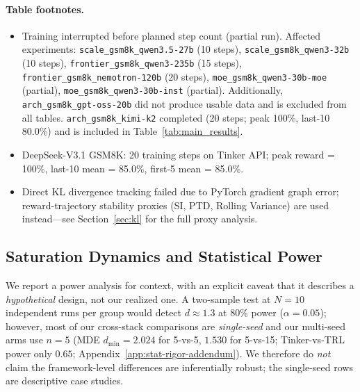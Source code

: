 \documentclass{article}
\begin{document}
\paragraph{Table footnotes.}
\begin{itemize}
    \item[$^\dagger$] Training interrupted before planned step count (partial run).
    Affected experiments:
    \texttt{scale\_gsm8k\_qwen3.5-27b} (10 steps), \texttt{scale\_gsm8k\_qwen3-32b} (10 steps),
    \texttt{frontier\_gsm8k\_qwen3-235b} (15 steps), \texttt{frontier\_gsm8k\_nemotron-120b} (20 steps),
    \texttt{moe\_gsm8k\_qwen3-30b-moe} (partial), \texttt{moe\_gsm8k\_qwen3-30b-inst} (partial).
    Additionally, \texttt{arch\_gsm8k\_gpt-oss-20b} did not produce usable data and is excluded
    from all tables. \texttt{arch\_gsm8k\_kimi-k2} completed (20 steps; peak 100\%, last-10 80.0\%)
    and is included in Table~\ref{tab:main_results}.
    \item[$^b$] DeepSeek-V3.1 GSM8K: 20 training steps on Tinker API;
    peak reward = 100\%, last-10 mean = 85.0\%, first-5 mean = 85.0\%.
    \item[$^h$] Direct KL divergence tracking failed due to PyTorch gradient graph error;
    reward-trajectory stability proxies (SI, PTD, Rolling Variance) are used
    instead---see Section~\ref{sec:kl} for the full proxy analysis.
\end{itemize}

\subsection{Saturation Dynamics and Statistical Power}
\label{sec:saturation_power}

We report a power analysis for context, with an explicit caveat that it describes
a \emph{hypothetical} design, not our realized one. A two-sample test at
$N=10$ independent runs per group would detect $d \approx 1.3$ at 80\% power
($\alpha=0.05$); however, most of our cross-stack comparisons are
\emph{single-seed} and our multi-seed arms use $n=5$ (MDE $d_{\min}=2.024$ for
5-vs-5, $1.530$ for 5-vs-15; Tinker-vs-TRL power only $0.65$;
Appendix~\ref{app:stat-rigor-addendum}). We therefore do \emph{not} claim the
framework-level differences are inferentially robust; the single-seed rows are
descriptive case studies.
\end{document}
